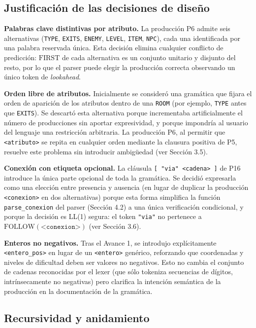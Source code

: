 \documentclass[10pt,twocolumn]{article}
\begin{document}
\subsection{Justificación de las decisiones de diseño}

\textbf{Palabras clave distintivas por atributo.} La producción P6 admite
seis alternativas (\texttt{TYPE}, \texttt{EXITS}, \texttt{ENEMY},
\texttt{LEVEL}, \texttt{ITEM}, \texttt{NPC}), cada una identificada por una
palabra reservada única. Esta decisión elimina cualquier conflicto de
predicción: $\mathrm{FIRST}$ de cada alternativa es un conjunto unitario y
disjunto del resto, por lo que el parser puede elegir la producción
correcta observando un único token de \textit{lookahead}.

\textbf{Orden libre de atributos.} Inicialmente se consideró una gramática
que fijara el orden de aparición de los atributos dentro de una
\texttt{ROOM} (por ejemplo, \texttt{TYPE} antes que \texttt{EXITS}). Se
descartó esta alternativa porque incrementaba artificialmente el número de
producciones sin aportar expresividad, y porque impondría al usuario del
lenguaje una restricción arbitraria. La producción P6, al permitir que
\texttt{<atributo>} se repita en cualquier orden mediante la clausura
positiva de P5, resuelve este problema sin introducir ambigüedad (ver
Sección 3.5).

\textbf{Conexión con etiqueta opcional.} La cláusula
\texttt{[ "via" <cadena> ]} de P16 introduce la única parte opcional de
toda la gramática. Se decidió expresarla como una elección entre presencia
y ausencia (en lugar de duplicar la producción \texttt{<conexion>} en dos
alternativas) porque esta forma simplifica la función
\texttt{parse\_conexion} del parser (Sección 4.2) a una única
verificación condicional, y porque la decisión es LL(1) segura: el token
\texttt{"via"} no pertenece a $\mathrm{FOLLOW}(\texttt{<conexion>})$ (ver
Sección 3.6).

\textbf{Enteros no negativos.} Tras el Avance 1, se introdujo expl\'icitamente
\texttt{<entero\_pos>} en lugar de un \texttt{<entero>} genérico, reforzando
que coordenadas y niveles de dificultad deben ser valores no negativos.
Esto no cambia el conjunto de cadenas reconocidas por el lexer (que sólo
tokeniza secuencias de dígitos, intrínsecamente no negativas) pero clarifica
la intención semántica de la producción en la documentación de la
gramática.

\subsection{Recursividad y anidamiento}
\end{document}
